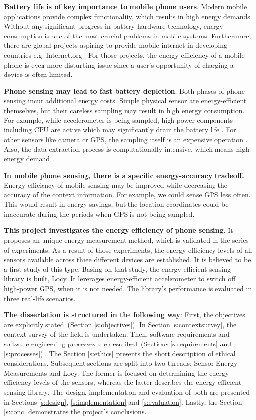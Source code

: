 \textbf{Battery life is of key importance to mobile phone users}. Modern mobile applications provide complex functionality, which results in high energy demands. Without any significant progress in battery hardware technology, energy consumption is one of the most crucial problems in mobile systems. Furthermore, there are global projects aspiring to provide mobile internet in developing countries e.g. Internet.org \cite{facebook:internetorg}. For those projects, the energy efficiency of a mobile phone is even more disturbing issue since a user's opportunity of charging a device is often limited.

\textbf{Phone sensing may lead to fast battery depletion}. Both phases of phone sensing incur additional energy costs. Simple physical sensor are energy-efficient themselves, but their careless sampling may result in high energy consumption. For example, while accelerometer is being sampled, high-power components including CPU are active which may significantly drain the battery life \cite{priyantha:littlerock}. For other sensors like camera or GPS, the sampling itself is an expensive operation \cite{benabdesslem:senseless}. Also, the data extraction process is computationally intensive, which means high energy demand \cite{musolesi:offloading}.

\textbf{In mobile phone sensing, there is a specific energy-accuracy tradeoff.} Energy efficiency of mobile sensing may be improved while decreasing the accuracy of the context information. For example, we could sense GPS less often. This would result in energy savings, but the location coordinates could be inaccurate during the periods when GPS is not being sampled.

\textbf{This project investigates the energy efficiency of phone sensing}. It proposes an unique energy measurement method, which is validated in the series of experiments. As a result of those experiments, the energy efficiency levels of all sensors available across three different devices are established. It is believed to be a first study of this type. Basing on that study, the energy-efficient sensing library is built, Locy. It leverages energy-efficient accelerometer to switch off high-power GPS, when it is not needed. The library's performance is evaluated in three real-life scenarios. 

\textbf{The dissertation is structured in the following way}: First, the objectives are explicitly stated\ (Section \ref{s:objectives}). In Section \ref{s:contextsurvey}, the context survey of the field is undertaken. Then, software requirements and software engineering processes are described\ (Sections \ref{s:requirements} and \ref{s:processes}) . The Section \ref{s:ethics} presents the short description of ethical considerations. Subsequent sections are split into two threads: Sensor Energy Measurements and Locy. The former is focused on determining the energy efficiency levels of the sensors, whereas the latter describes the energy efficient sensing library. The design, implementation and evaluation of both are presented in Sections \ref{s:design}, \ref{s:implementation} and \ref{s:evaluation}. Lastly, the Section \ref{s:conc} demonstrates the project's conclusions.
